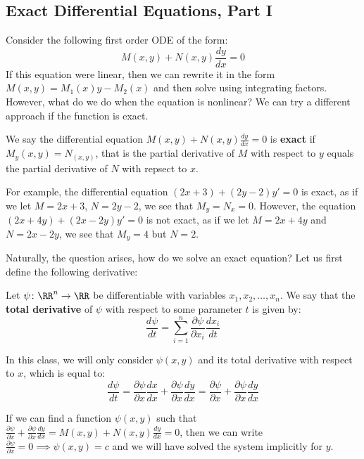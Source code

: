\subsection{Exact Differential Equations, Part I}

Consider the following first order ODE of the form:
\[ M(x,y) + N(x,y)\frac{dy}{dx} = 0\]
If this equation were linear, then we can rewrite it in the form $M(x,y) = M_1(x)y - M_2(x)$ and then solve using integrating factors. However, what do we do when the equation is nonlinear? We can try a different approach if the function is exact.

\begin{defbox}
   We say the differential equation $M(x,y) + N(x,y)\frac{dy}{dx} = 0$ is \textbf{exact} if $M_y(x,y) = N_(x,y)$, that is the partial derivative of $M$ with respect to $y$ equals the partial derivative of $N$ with repsect to $x$. 
\end{defbox}

For example, the differential equation $(2x + 3) + (2y - 2)y' = 0$ is exact, as if we let $M = 2x + 3$, $N = 2y - 2$, we see that $M_y = N_x = 0$. However, the equation $(2x + 4y) + (2x - 2y)y' = 0$ is not exact, as if we let $M = 2x + 4y$ and $N = 2x - 2y$, we see that $M_y = 4$ but $N = 2$. 

Naturally, the question arises, how do we solve an exact equation? Let us first define the following derivative:

\begin{defbox}
   Let $\psi \colon \RR^n \to \RR$ be differentiable with variables $x_1, x_2, \dots, x_n$. We say that the \textbf{total derivative} of $\psi$ with respect to some parameter $t$ is given by:
   \[ \frac{d\psi}{dt} = \displaystyle\sum_{i = 1}^{n} \frac{\partial \psi}{\partial x_i} \frac{dx_i}{dt} \]
   
In this class, we will only consider $\psi(x,y)$ and its total derivative with respect to $x$, which is equal to:
\[ \frac{d\psi}{dt} = \frac{\partial \psi}{\partial x} \frac{dx}{dx} + \frac{\partial \psi}{\partial x} \frac{dy}{dx} = \frac{\partial \psi}{\partial x} + \frac{\partial \psi}{\partial x} \frac{dy}{dx}\]
\end{defbox}

If we can find a function $\psi(x,y)$ such that $\frac{\partial \psi}{\partial x} + \frac{\partial \psi}{\partial x} \frac{dy}{dx} = M(x,y) + N(x,y) \frac{dy}{dx} = 0$, then we can write $\frac{\partial \psi}{\partial x} = 0 \implies \psi(x,y) = c$ and we will have solved the system implicitly for $y$.

